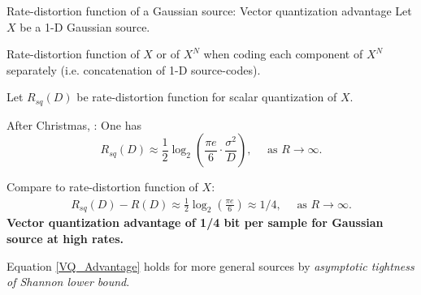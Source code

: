 \begin{frame}{Rate-distortion function of a Gaussian source: Vector quantization advantage}
Let $X$ be a 1-D Gaussian source.
\bit
\item {} Rate-distortion function of $X$ or of $X^N$ when coding each component of $X^N$ separately (i.e. concatenation of 1-D source-codes).  
\item Let $R_{sq}(D)$ be rate-distortion function for scalar quantization of $X$. 
\item After Christmas, :
One has
\[
R_{sq}(D)\approx \frac{1}{2}\log_2\left(\frac{\pi e}{6}\cdot\frac{\sigma^2}{D}\right), \quad\text { as $R\to\infty$.}
\]
\item[\iarrow] Compare to rate-distortion function of $X$:  
\begin{align}\label{VQ_Advantage}
R_{sq}(D)-R(D)\approx \frac{1}{2}\log_2\left(\frac{\pi e}{6}\right)\approx 1/4,  \quad\text { as $R\to\infty$.}
\end{align}
\eit
\alert{\iarrow \textbf{Vector quantization advantage of 1/4 bit per sample for Gaussian source at high rates.}}
\bit
\item Equation \eqref{VQ_Advantage} holds for more general sources by \textit{asymptotic tightness of Shannon lower bound}. 
\eit
\end{frame}


